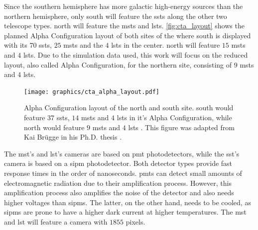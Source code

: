 Since the southern hemisphere has more galactic high-energy sources than the northern hemisphere,
only \cta{} south will feature the \glspl{sst} along the other two telescope types. \cta{} north
will feature the \glspl{mst} and \glspl{lst}. \autoref{fig:cta_layout} shows the planned Alpha
Configuration layout of both sites of the \cta{} where \cta{} south is displayed with its \(\num{70}\)
\glspl{sst}, \(\num{25}\) \glspl{mst} and the \(\num{4}\) \glspl{lst} in the center. \cta{} north
will feature \(\num{15}\) \glspl{mst} and \(\num{4}\) \glspl{lst}. Due to the simulation data used,
this work will focus on the reduced layout, also called Alpha Configuration, for the northern site,
consisting of \(\num{9}\) \glspl{mst} and \(\num{4}\) \glspl{lst}.
\begin{figure}
    \centering
    \texttt{[image: graphics/cta\_alpha\_layout.pdf]}
    \caption{Alpha Configuration layout of the \cta{} north and \cta{}
    south site. \cta{} south would feature \(\num{37}\) \glspl{sst}, \(\num{14}\) \glspl{mst} and
    \(\num{4}\) \glspl{lst} \cite{cta_south_layout} in it's Alpha Configuration, while \cta{} north would
    feature \(\num{9}\) \glspl{mst} and \(\num{4}\) \glspl{lst} \cite{cta_north_layout}.
    This figure was adapted from Kai Br\"ugge in his Ph.D. thesis \cite{bruegge_thesis}.}
    \label{fig:cta_layout}
\end{figure}

The \gls{mst}'s and \gls{lst}'s cameras are based on \gls{pmt} photodetectors, while the \gls{sst}'s
camera is based on a \gls{sipm} photodetector. Both detector types provide fast response times in the
order of nanoseconds. \glspl{pmt} can detect small amounts of electromagnetic radiation due to their
amplification process. However, this amplification process also amplifies the noise of the detector
and also needs higher voltages than \glspl{sipm}. The latter, on the other hand, needs to be cooled,
as \glspl{sipm} are prone to have a higher dark current at higher temperatures. The \gls{mst} and
\gls{lst} will feature a camera with \(\num{1855}\) pixels.

